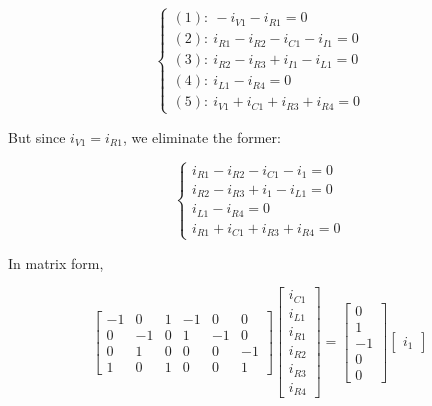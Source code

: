 \begin{example}
\begin{equation} %
	\left\{\begin{array}{l}
		(1):\ -i_{V1} - i_{R1} = 0 \\[3mm]
		(2):\ i_{R1} - i_{R2} - i_{C1} - i_{I1} = 0 \\[3mm]
		(3):\ i_{R2} - i_{R3} + i_{I1} - i_{L1} = 0 \\[3mm]
		(4):\ i_{L1} - i_{R4} = 0 \\[3mm] 
		(5):\ i_{V1} + i_{C1} + i_{R3} + i_{R4} = 0 
	\end{array}\right.
\end{equation} %

	But since $i_{V1} = i_{R1}$, we eliminate the former:

\begin{equation} %
	\left\{\begin{array}{l}
		i_{R1} - i_{R2} - i_{C1} - i_1 = 0 \\[3mm]
		i_{R2} - i_{R3} + i_1 - i_{L1} = 0 \\[3mm]
		i_{L1} - i_{R4} = 0 \\[3mm] 
		i_{R1} + i_{C1} + i_{R3} + i_{R4} = 0 
	\end{array}\right.
\end{equation} %

	In matrix form,

\begin{equation} %
%
	\left[\begin{array}{ccccccc}
	-1 &  0 &  1 &-1 & 0 & 0 \\[3mm]
	 0 & -1 &  0 & 1 &-1 & 0 \\[3mm]
	 0 &  1 &  0 & 0 & 0 &-1 \\[3mm]
	 1 &  0 &  1 & 0 & 0 & 1 
	\end{array}\right]
%
	\left[\begin{array}{c}
		i_{C1} \\[3mm] i_{L1} \\[3mm] i_{R1} \\[3mm] i_{R2} \\[3mm] i_{R3} \\[3mm] i_{R4}
	\end{array}\right] =
%
	\left[\begin{array}{c}
		0 \\[3mm] 1 \\[3mm] -1 \\[3mm] 0 \\[3mm] 0
	\end{array}\right]
%
	\left[\begin{array}{c}
		i_1
	\end{array}\right] \label{eq:example_KCL}
\end{equation} %


\end{example}
